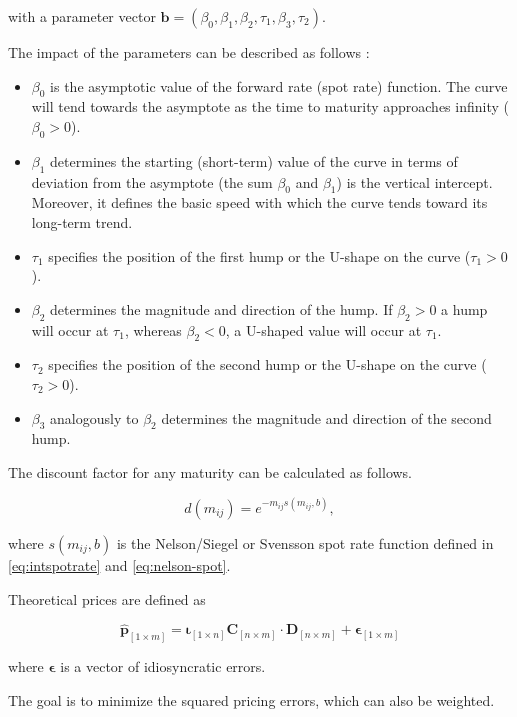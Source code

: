 with a parameter vector ${\bm{b}} = \left(\beta_0,\beta_1,\beta_2,\tau_1,\beta_3,\tau_2\right)$.

The impact of the parameters can be described as follows \citep[see][p.7]{Bolder1999}:

\begin{itemize}
\item $\beta_0$ is the asymptotic value of the forward rate (spot rate) function.  The curve will tend towards the asymptote as the time to maturity approaches  infinity ($\beta_0 >0$).
\item $\beta_1$ determines the starting (short-term) value of the curve in terms of deviation from the asymptote (the sum $\beta_0$ and $\beta_1$) is the vertical intercept. Moreover, it defines the basic speed with which the curve tends toward its long-term trend.
\item $\tau_1$ specifies the position of the first hump or the U-shape on the curve ($\tau_1>0$).
\item $\beta_2$ determines the magnitude and direction of the hump. If $\beta_2 >0$  a hump will occur at  $\tau_1$, whereas $\beta_2<0$, a U-shaped value will occur at $\tau_1$.
\item $\tau_2$ specifies the position of the second hump or the U-shape on the curve ($\tau_2>0$).
\item $\beta_3$ analogously  to  $\beta_2$ determines the magnitude and direction of the second hump.
\end{itemize}


The discount factor for any maturity can be calculated as follows. 

\begin{displaymath}
d(m_{ij})=e^{-m_{ij}s(m_{ij},b)},
\end{displaymath}

where $s(m_{ij},b)$ is the Nelson/Siegel or Svensson spot rate function defined in \eqref{eq:intspotrate} and \eqref{eq:nelson-spot}.

Theoretical prices are defined as

\begin{equation}
  \label{eq:theorprices}
  \bm{\hat{p}}_{[1\times m]} = \bm{\iota}_{[1\times n]}\bm{C}_{[n\times m]}\cdot\bm{D}_{[n\times m]}+\bm{\epsilon}_{[1\times m]}
\end{equation}

where $\bm{\epsilon}$ is a vector of idiosyncratic errors.

The goal is to minimize the squared pricing errors, which can also be weighted.

